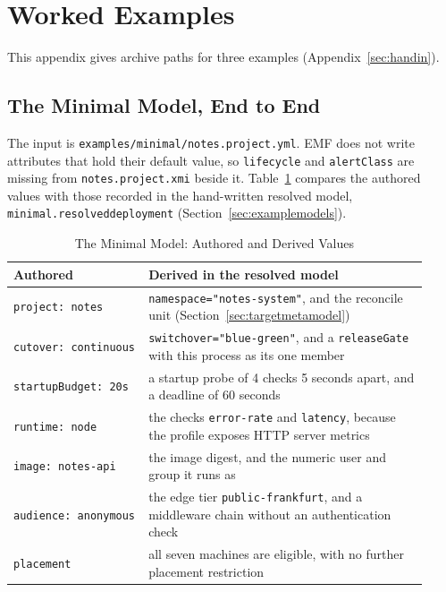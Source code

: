 \section{Worked Examples}
\label{sec:appendix}

This appendix gives archive paths for three examples
(Appendix~\ref{sec:handin}).

\subsection{The Minimal Model, End to End}
\label{sec:appendix-minimal}

The input is \texttt{examples/minimal/notes.project.yml}. EMF does not write
attributes that hold their default value, so \texttt{lifecycle} and
\texttt{alertClass} are missing from \texttt{notes.project.xmi} beside it.
Table~\ref{tab:minimal-trace} compares the authored values with those recorded
in the hand-written resolved model, \texttt{minimal.resolveddeployment}
(Section~\ref{sec:examplemodels}).

\begin{table}[!htbp]
\centering
\footnotesize
\begin{tabular}{>{\raggedright\arraybackslash}p{0.30\linewidth}>{\raggedright\arraybackslash}p{0.62\linewidth}}
\hline
\textbf{Authored} & \textbf{Derived in the resolved model} \\
\hline
\texttt{project: notes} & \texttt{namespace="notes-system"}, and the reconcile unit (Section~\ref{sec:targetmetamodel}) \\
\texttt{cutover: continuous} & \texttt{switchover="blue-green"}, and a \texttt{releaseGate} with this process as its one member \\
\texttt{startupBudget: 20s} & a startup probe of 4 checks 5 seconds apart, and a deadline of 60 seconds \\
\texttt{runtime: node} & the checks \texttt{error-rate} and \texttt{latency}, because the profile exposes HTTP server metrics \\
\texttt{image: notes-api} & the image digest, and the numeric user and group it runs as \\
\texttt{audience: anonymous} & the edge tier \texttt{public-frankfurt}, and a middleware chain without an authentication check \\
\texttt{placement} & all seven machines are eligible, with no further placement restriction \\
\hline
\end{tabular}
\caption{The Minimal Model: Authored and Derived Values}
\label{tab:minimal-trace}
\end{table}

